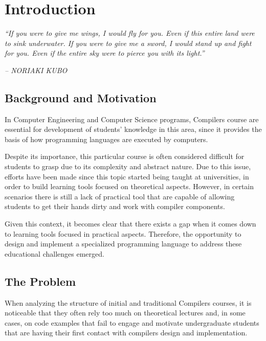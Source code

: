 \chapter{Introduction} \label{cap:introduction}

\begin{displayquote}
    \begin{center}
        \textit{``If you were to give me wings, I would fly for you. Even if this entire land were to sink underwater. If you were to give me a sword, I would stand up and fight for you. Even if the entire sky were to pierce you with its light.''}
    \end{center}
\end{displayquote}

\begin{flushright}
   \textit{-- NORIAKI KUBO}
\end{flushright}

\section{Background and Motivation}
In Computer Engineering and Computer Science programs, Compilers course are essential for development of students' knowledge in this area, since it provides the basis of how programming languages are executed by computers.

Despite its importance, this particular course is often considered difficult for students to grasp due to its complexity and abstract nature. Due to this issue, efforts have been made since this topic started being taught at universities, in order to build learning tools focused on theoretical aspects. However, in certain scenarios there is still a lack of practical tool that are capable of allowing students to get their hands dirty and work with compiler components.

Given this context, it becomes clear that there exists a gap when it comes down to learning tools focused in practical aspects. Therefore, the opportunity to design and implement a specialized programming language to address these educational challenges emerged.

\section{The Problem}
When analyzing the structure of initial and traditional Compilers courses, it is noticeable that they often rely too much on theoretical lectures and, in some cases, on code examples that fail to engage and motivate undergraduate students that are having their first contact with compilers design and implementation.

